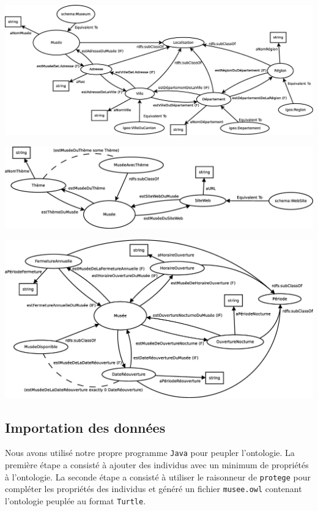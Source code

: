 \documentclass{article}
\begin{document}
\begin{center}
\includegraphics[width=16cm]{Diagramme1.eps}
\end{center}
\vspace{0.3cm}
\begin{center}
\includegraphics[width=16cm]{Diagramme2.eps}
\end{center}
\vspace{0.3cm}
\begin{center}
\includegraphics[width=16cm]{Diagramme3.eps}
\end{center}

\subsection{Importation des données}

Nous avons utilisé notre propre programme \texttt{Java} pour peupler
l'ontologie. La première étape a consisté à ajouter des individus avec un
minimum de propriétés à l'ontologie. La seconde étape a consisté à
utiliser le raisonneur de \texttt{protege} pour compléter les propriétés des
individus et généré un fichier \texttt{musee.owl} contenant l'ontologie peuplée
au format \texttt{Turtle}.
\end{document}
